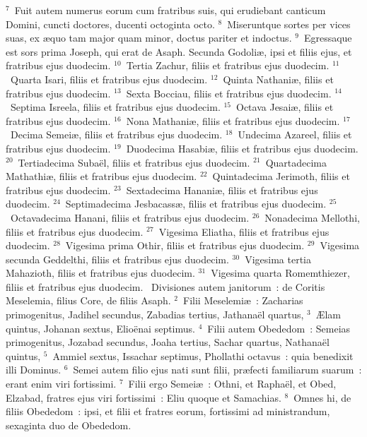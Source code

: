 ${}^{7}$~Fuit autem numerus eorum cum fratribus suis, qui erudiebant canticum Domini, cuncti doctores, ducenti octoginta octo.
${}^{8}$~Miseruntque sortes per vices suas, ex \ae quo tam major quam minor, doctus pariter et indoctus.
${}^{9}$~Egressaque est sors prima Joseph, qui erat de Asaph. Secunda Godoli\ae , ipsi et filiis ejus, et fratribus ejus duodecim.
${}^{10}$~Tertia Zachur, filiis et fratribus ejus duodecim.
${}^{11}$~Quarta Isari, filiis et fratribus ejus duodecim.
${}^{12}$~Quinta Nathani\ae , filiis et fratribus ejus duodecim.
${}^{13}$~Sexta Bocciau, filiis et fratribus ejus duodecim.
${}^{14}$~Septima Isreela, filiis et fratribus ejus duodecim.
${}^{15}$~Octava Jesai\ae , filiis et fratribus ejus duodecim.
${}^{16}$~Nona Mathani\ae , filiis et fratribus ejus duodecim.
${}^{17}$~Decima Semei\ae , filiis et fratribus ejus duodecim.
${}^{18}$~Undecima Azareel, filiis et fratribus ejus duodecim.
${}^{19}$~Duodecima Hasabi\ae , filiis et fratribus ejus duodecim.
${}^{20}$~Tertiadecima Suba\"el, filiis et fratribus ejus duodecim.
${}^{21}$~Quartadecima Mathathi\ae , filiis et fratribus ejus duodecim.
${}^{22}$~Quintadecima Jerimoth, filiis et fratribus ejus duodecim.
${}^{23}$~Sextadecima Hanani\ae , filiis et fratribus ejus duodecim.
${}^{24}$~Septimadecima Jesbacass\ae , filiis et fratribus ejus duodecim.
${}^{25}$~Octavadecima Hanani, filiis et fratribus ejus duodecim.
${}^{26}$~Nonadecima Mellothi, filiis et fratribus ejus duodecim.
${}^{27}$~Vigesima Eliatha, filiis et fratribus ejus duodecim.
${}^{28}$~Vigesima prima Othir, filiis et fratribus ejus duodecim.
${}^{29}$~Vigesima secunda Geddelthi, filiis et fratribus ejus duodecim.
${}^{30}$~Vigesima tertia Mahazioth, filiis et fratribus ejus duodecim.
${}^{31}$~Vigesima quarta Romemthiezer, filiis et fratribus ejus duodecim.
~Divisiones autem janitorum~: de Coritis Meselemia, filius Core, de filiis Asaph.
${}^{2}$~Filii Meselemi\ae~: Zacharias primogenitus, Jadihel secundus, Zabadias tertius, Jathana\"el quartus,
${}^{3}$~\AE lam quintus, Johanan sextus, Elio\"enai septimus.
${}^{4}$~Filii autem Obededom~: Semeias primogenitus, Jozabad secundus, Joaha tertius, Sachar quartus, Nathana\"el quintus,
${}^{5}$~Ammiel sextus, Issachar septimus, Phollathi octavus~: quia benedixit illi Dominus.
${}^{6}$~Semei autem filio ejus nati sunt filii, pr\ae fecti familiarum suarum~: erant enim viri fortissimi.
${}^{7}$~Filii ergo Semei\ae~: Othni, et Rapha\"el, et Obed, Elzabad, fratres ejus viri fortissimi~: Eliu quoque et Samachias.
${}^{8}$~Omnes hi, de filiis Obededom~: ipsi, et filii et fratres eorum, fortissimi ad ministrandum, sexaginta duo de Obededom.

